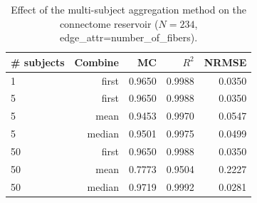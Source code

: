 \begin{table}[h]
    \centering
    \caption{Effect of the multi-subject aggregation method on the connectome reservoir ($N{=}234$, edge\_attr=number\_of\_fibers).}
    \label{tab:mg_combine}
    \begin{tabular}{lrrrr}
        \hline
        \# subjects & Combine & MC & $R^2$ & NRMSE \\
        \hline
        1 & first & 0.9650 & 0.9988 & 0.0350 \\
        5 & first & 0.9650 & 0.9988 & 0.0350 \\
        5 & mean & 0.9453 & 0.9970 & 0.0547 \\
        5 & median & 0.9501 & 0.9975 & 0.0499 \\
        50 & first & 0.9650 & 0.9988 & 0.0350 \\
        50 & mean & 0.7773 & 0.9504 & 0.2227 \\
        50 & median & 0.9719 & 0.9992 & 0.0281 \\
        \hline
    \end{tabular}
\end{table}
